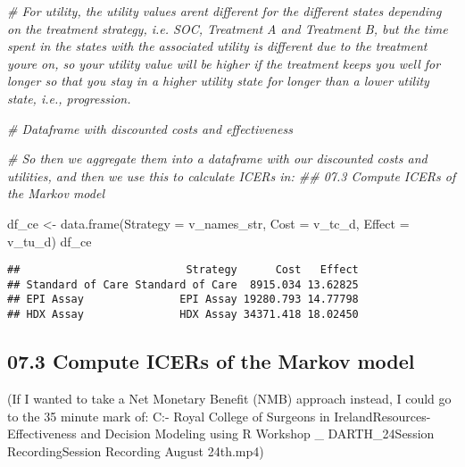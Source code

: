\documentclass[
]{article}
\newenvironment{Shaded}{\begin{snugshade}}{\end{snugshade}}
\newcommand{\AttributeTok}[1]{\textcolor[rgb]{0.77,0.63,0.00}{#1}}
\newcommand{\CommentTok}[1]{\textcolor[rgb]{0.56,0.35,0.01}{\textit{#1}}}
\newcommand{\FunctionTok}[1]{\textcolor[rgb]{0.00,0.00,0.00}{#1}}
\newcommand{\NormalTok}[1]{#1}
\newcommand{\OtherTok}[1]{\textcolor[rgb]{0.56,0.35,0.01}{#1}}
\newcommand{\SpecialCharTok}[1]{\textcolor[rgb]{0.00,0.00,0.00}{#1}}
\begin{document}
\begin{Shaded}
\begin{Highlighting}[]
\CommentTok{\# For utility, the utility values aren\textquotesingle{}t different for the different states depending on the treatment strategy, i.e. SOC, Treatment A and Treatment B, but the time spent in the states with the associated utility is different due to the treatment you\textquotesingle{}re on, so your utility value will be higher if the treatment keeps you well for longer so that you stay in a higher utility state for longer than a lower utility state, i.e., progression.}


\CommentTok{\# Dataframe with discounted costs and effectiveness}

\CommentTok{\# So then we aggregate them into a dataframe with our discounted costs and utilities, and then we use this to calculate ICERs in: \#\# 07.3 Compute ICERs of the Markov model}

\NormalTok{df\_ce }\OtherTok{\textless{}{-}} \FunctionTok{data.frame}\NormalTok{(}\AttributeTok{Strategy =}\NormalTok{ v\_names\_str,}
                    \AttributeTok{Cost     =}\NormalTok{ v\_tc\_d, }
                    \AttributeTok{Effect   =}\NormalTok{ v\_tu\_d)}
\NormalTok{df\_ce}
\end{Highlighting}
\end{Shaded}

\begin{verbatim}
##                          Strategy      Cost   Effect
## Standard of Care Standard of Care  8915.034 13.62825
## EPI Assay               EPI Assay 19280.793 14.77798
## HDX Assay               HDX Assay 34371.418 18.02450
\end{verbatim}

\hypertarget{compute-icers-of-the-markov-model}{%
\subsection{07.3 Compute ICERs of the Markov
model}\label{compute-icers-of-the-markov-model}}

(If I wanted to take a Net Monetary Benefit (NMB) approach instead, I
could go to the 35 minute mark of: C:\Users\Jonathan\OneDrive - Royal
College of Surgeons in
Ireland\COLOSSUS\Training Resources\Cost-Effectiveness and Decision
Modeling using R Workshop \_ DARTH\August\_24\Live Session
Recording\Live Session Recording August 24th.mp4)

\begin{Shaded}
\end{Shaded}
\end{document}
